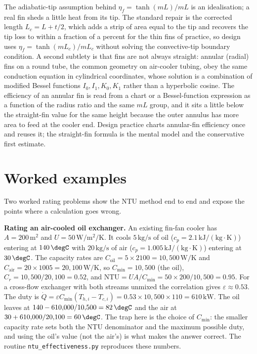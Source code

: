 \begin{mastery}
The adiabatic-tip assumption behind $\eta_f = \tanh(mL)/mL$ is an idealisation;
a real fin sheds a little heat from its tip. The standard repair is the corrected
length $L_c = L + t/2$, which adds a strip of area equal to the tip and recovers
the tip loss to within a fraction of a percent for the thin fins of practice,
so design uses $\eta_f = \tanh(mL_c)/mL_c$ without solving the convective-tip
boundary condition. A second subtlety is that fins are not always straight: annular
(radial) fins on a round tube, the common geometry on air-cooler tubing, obey the
same conduction equation in cylindrical coordinates, whose solution is a
combination of modified Bessel functions $I_0, I_1, K_0, K_1$ rather than a
hyperbolic cosine. The efficiency of an annular fin is read from a chart or a
Bessel-function expression as a function of the radius ratio and the same $mL$
group, and it sits a little below the straight-fin value for the same height
because the outer annulus has more area to feed at the cooler end. Design practice
charts annular-fin efficiency once and reuses it; the straight-fin formula is the
mental model and the conservative first estimate.
\end{mastery}

\section{Worked examples}

Two worked rating problems show the NTU method end to end and expose
the points where a calculation goes wrong.

\textbf{Rating an air-cooled oil exchanger.} An existing fin-fan cooler
has $A = 200\,\text{m}^2$ and $U = 50\,\si{\watt\per\meter\squared\per
\kelvin}$. It cools $5\,\text{kg/s}$ of oil ($c_p = 2.1\,\text{kJ}/
(\text{kg}\cdot\si{\kelvin})$) entering at $140\,\degC$ with $20\,
\text{kg/s}$ of air ($c_p = 1.005\,\text{kJ}/(\text{kg}\cdot\si{
\kelvin})$) entering at $30\,\degC$. The capacity rates are $C_{\text{oil}}
= 5 \times 2100 = 10{,}500\,\si{\watt\per\kelvin}$ and $C_{\text{air}}
= 20 \times 1005 = 20{,}100\,\si{\watt\per\kelvin}$, so $C_{\min} =
10{,}500$ (the oil), $C_r = 10{,}500/20{,}100 = 0.52$, and $\text{NTU}
= UA/C_{\min} = 50 \times 200/10{,}500 = 0.95$. For a cross-flow
exchanger with both streams unmixed the correlation gives $\varepsilon
\approx 0.53$. The duty is $\dot{Q} = \varepsilon C_{\min}(T_{h,i} -
T_{c,i}) = 0.53 \times 10{,}500 \times 110 = 610\,\text{kW}$. The oil
leaves at $140 - 610{,}000/10{,}500 = 82\,\degC$ and the air at $30 +
610{,}000/20{,}100 = 60\,\degC$. The trap here is the choice of
$C_{\min}$: the smaller capacity rate sets both the NTU denominator and
the maximum possible duty, and using the oil's value (not the air's) is
what makes the answer correct. The routine
\texttt{ntu\_effectiveness.py} reproduces these numbers.

